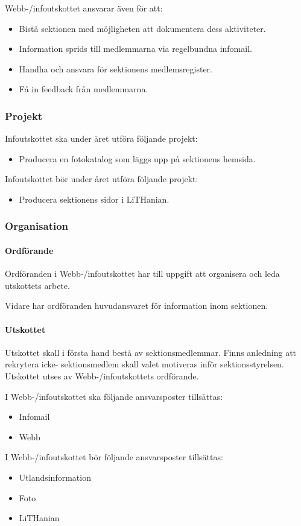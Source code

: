 \documentclass{datateknologsektionen-document}
\begin{document}
Webb-/infoutskottet ansvarar även för att:
\begin{itemize}
  \item Bistå sektionen med möjligheten att dokumentera dess aktiviteter.
  \item Information sprids till medlemmarna via regelbundna infomail.
  \item Handha och ansvara för sektionens medlemsregister.
  \item Få in feedback från medlemmarna.
\end{itemize}

\subsubsection{Projekt}
Infoutskottet ska under året utföra följande projekt:
\begin{itemize}
  \item Producera en fotokatalog som läggs upp på sektionens hemsida.
\end{itemize}
Infoutskottet bör under året utföra följande projekt:
\begin{itemize}
  \item Producera sektionens sidor i LiTHanian.
\end{itemize}

\subsubsection{Organisation}
\paragraph{Ordförande}
Ordföranden i Webb-/infoutskottet har till uppgift att organisera och leda utskottets arbete.

Vidare har ordföranden huvudansvaret för information inom sektionen.
\paragraph{Utskottet}

Utskottet skall i första hand bestå av sektionsmedlemmar. Finns anledning att rekrytera icke-
sektionsmedlem skall valet motiveras inför sektionsstyrelsen. Utskottet utses av Webb-/infoutskottets ordförande.

I Webb-/infoutskottet ska följande ansvarsposter tillsättas:
\begin{itemize}
  \item Infomail
  \item Webb
\end{itemize}
I Webb-/infoutskottet bör följande ansvarsposter tillsättas:
\begin{itemize}
  \item Utlandsinformation
  \item Foto
  \item LiTHanian
\end{itemize}
\end{document}
